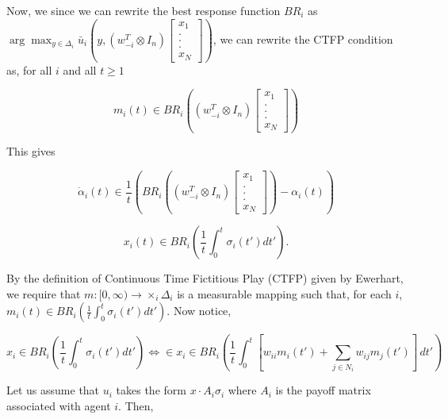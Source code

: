 \documentclass{article}
\theoremstyle{definition}
\begin{document}
	
	Now, we since we can rewrite the best response function $BR_i$ as $\arg\max_{y \in \Delta_i} \bar{u}_i(y, (w_{-i}^T \otimes I_n) \begin{bmatrix}
		x_1 \\ . \\ . \\ . \\ x_N
	\end{bmatrix})$, we can rewrite the CTFP condition as, for all $i$ and all $t \geq 1$

	\begin{equation}
		m_i(t) \in BR_i((w_{-i}^T \otimes I_n) \begin{bmatrix}
			x_1 \\ . \\ . \\ . \\ x_N
		\end{bmatrix})
	\end{equation}
	
	This gives 
	
	\begin{equation}
		\Dot{\alpha}_i(t) \in \frac{1}{t} (BR_i((w_{-i}^T \otimes I_n) \begin{bmatrix}
			x_1 \\ . \\ . \\ . \\ x_N
		\end{bmatrix}) - \alpha_i(t))
	\end{equation}
	
	\newpage
	
	\begin{equation}
		x_i(t) \in BR_i \left( \frac{1}{t} \int_{0}^{t} \sigma_i(t') dt' \right).
	\end{equation}
	
	By the definition of Continuous Time Fictitious Play (CTFP) given by Ewerhart, we require that $m: [0, \infty) \rightarrow \times_i \Delta_i$ is a measurable mapping such that, for each $i$, $m_i(t) \in BR_i \left( \frac{1}{t} \int_{0}^{t} \sigma_i(t') dt' \right)$. Now notice,
	
	\begin{equation*}
		x_i \in BR_i \left( \frac{1}{t} \int_{0}^{t} \sigma_i(t') dt' \right) \iff  \in x_i\in BR_i \left( \frac{1}{t} \int_{0}^{t} [w_{ii} m_i(t') + \sum_{j \in N_i} w_{ij} m_j(t')] \, dt' \right)
	\end{equation*}
	
	Let us assume that $u_i$ takes the form $x \cdot A_i \sigma_i$ where $A_i$ is the payoff matrix associated with agent $i$. Then,
	
\end{document}
